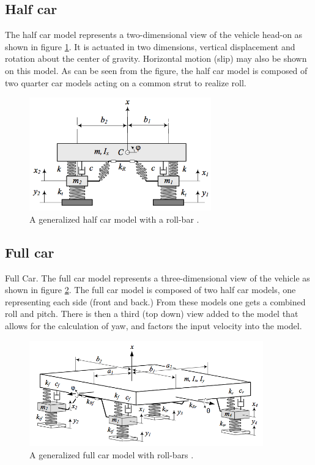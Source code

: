 \subsection{Half car}
The half car model represents a two-dimensional view of the vehicle head-on as shown in figure \ref{fig:half_car}. It is actuated in two dimensions, vertical displacement and rotation about the center of gravity. Horizontal motion (slip) may also be shown on this model. As can be seen from the figure, the half car model is composed of two quarter car models acting on a common strut to realize roll.

\begin{figure}[t]
	\centering
	\includegraphics[width=0.7\textwidth]{figures/half_car.png}
	\caption{A generalized half car model with a roll-bar \cite{book:jazar}.}
	\label{fig:half_car}
\end{figure}

\subsection{Full car}
Full Car. The full car model represents a three-dimensional view of the vehicle as shown in figure \ref{fig:full_car}. The full car model is composed of two half car models, one representing each side (front and back.) From these models one gets a combined roll and pitch. There is then a third (top down) view added to the model that allows for the calculation of yaw, and factors the input velocity into the model.

\begin{figure}[t]
	\centering
	\includegraphics[width=0.9\textwidth]{figures/full_car.png}
	\caption{A generalized full car model with roll-bars \cite{book:jazar}.}
	\label{fig:full_car}
\end{figure}

